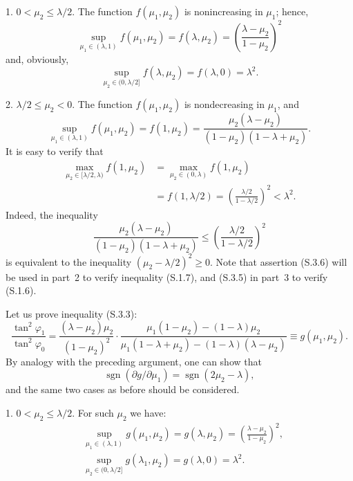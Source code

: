 \documentclass[11pt,oneside]{book}
\begin{document}
1. $0 < \mu_2 \leqslant \lambda/2$. The function $f(\mu_1, \mu_2)$ is nonincreasing in $\mu_1$; hence,
\[
\sup_{\mu_1 \in (\lambda, 1)} f(\mu_1, \mu_2) = f(\lambda, \mu_2) = \left( \frac{\lambda - \mu_2}{1 - \mu_2} \right)^2
\]
and, obviously,
\[
\sup_{\mu_2 \in (0, \lambda/2]} f(\lambda, \mu_2) = f(\lambda, 0) = \lambda^2. \tag{S.3.5}
\]

2. $\lambda/2 \leqslant \mu_2 < 0$. %
The function $f(\mu_1, \mu_2)$ is nondecreasing in $\mu_1$, and
\[
\sup_{\mu_1 \in (\lambda, 1)} f(\mu_1, \mu_2) = f(1, \mu_2) = \frac{\mu_2(\lambda - \mu_2)}{(1 - \mu_2)(1 - \lambda + \mu_2)}.
\]
It is easy to verify that
\[
\begin{aligned}
\max_{\mu_2 \in [\lambda/2, \lambda)} f(1, \mu_2) &= \max_{\mu_2 \in (0, \lambda)} f(1, \mu_2) \\
&= f(1, \lambda/2) = \left( \frac{\lambda/2}{1 - \lambda/2} \right)^2 < \lambda^2.
\end{aligned}
\tag{S.3.6}
\]
Indeed, the inequality
\[
\frac{\mu_2(\lambda - \mu_2)}{(1 - \mu_2)(1 - \lambda + \mu_2)} \leqslant \left( \frac{\lambda/2}{1 - \lambda/2} \right)^2
\]
is equivalent to the inequality $(\mu_2 - \lambda/2)^2 \geqslant 0$. Note that assertion (S.3.6) will be used in part~2 to verify inequality (S.1.7), and (S.3.5) in part~3 to verify (S.1.6).

Let us prove inequality (S.3.3):
\[
\frac{\tan^2 \varphi_1}{\tan^2 \varphi_0} = \frac{(\lambda - \mu_2)\mu_2}{(1 - \mu_2)^2} \cdot \frac{\mu_1(1 - \mu_2) - (1 - \lambda)\mu_2}{\mu_1(1 - \lambda + \mu_2) - (1 - \lambda)(\lambda - \mu_2)} \equiv g(\mu_1, \mu_2).
\]
By analogy with the preceding argument, one can show that
\[
\operatorname{sgn}(\partial g / \partial \mu_1) = \operatorname{sgn}(2\mu_2 - \lambda),
\]
and the same two cases as before should be considered.

1. $0 < \mu_2 \leqslant \lambda/2$. For such $\mu_2$ we have:
\[
\begin{aligned}
&\sup_{\mu_1 \in (\lambda, 1)} g(\mu_1, \mu_2) = g(\lambda, \mu_2) = \left( \frac{\lambda - \mu_2}{1 - \mu_2} \right)^2, \\
&\sup_{\mu_2 \in (0, \lambda/2]} g(\lambda_1, \mu_2) = g(\lambda, 0) = \lambda^2. %
\end{aligned}
\tag{S.3.7}
\]
\end{document}
